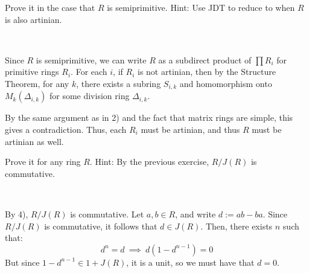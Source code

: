 \begin{exr}
	Prove it in the case that $R$ is semiprimitive.
	Hint: Use JDT to reduce to when $R$ is also artinian.
\end{exr} \

\begin{pf}
	Since $R$ is semiprimitive, we can write $R$ as a subdirect product
	of $\prod R_{i}$ for primitive rings $R_{i}$.
	For each $i$, if $R_{i}$ is not artinian, then by the Structure Theorem,
	for any $k$, there exists a subring $S_{i,k}$ and homomorphism onto
	$M_{k}(\Delta_{i,k})$ for some division ring $\Delta_{i,k}$.

	By the same argument as in 2) and the fact that matrix rings are simple,
	this gives a contradiction.
	Thus, each $R_{i}$ must be artinian, and thus $R$ must be artinian as well.
\end{pf}

\newpage
\begin{exr}
	Prove it for any ring $R$.
	Hint: By the previous exercise, $R/J(R)$ is commutative.
\end{exr} \

\begin{pf}
	By 4), $R/J(R)$ is commutative.
	Let $a,b\in R$, and write $d:=ab-ba$.
	Since $R/J(R)$ is commutative, it follows that $d\in J(R)$.
	Then, there exists $n$ such that:
	\begin{equation*}
		d^{n}=d \ \implies \ d(1-d^{n-1})=0
	\end{equation*}
	But since $1-d^{n-1}\in1+J(R)$, it is a unit, so we must have that $d=0$.
\end{pf}
